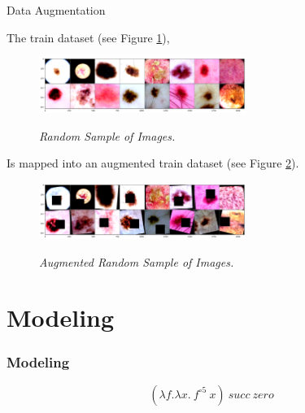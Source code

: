\documentclass[dvipsnames,mathserif]{beamer}
\begin{document}
{\begin{frame}
    \end{frame}

    \begin{frame}

      \large Data Augmentation
      \vspace{0.25cm}

      \footnotesize

      The train dataset (see Figure \ref{fig:sample-of-datasets}),

      \begin{figure}[H]
        \centering
        \includegraphics[width=0.6\textwidth]{images/random-sample-of-isic.png}
        \caption[Random Sample of Images]{\footnotesize{\textit{Random Sample of Images.}}}
        {\label{fig:sample-of-datasets}}
      \end{figure}

      Is mapped into an augmented train dataset (see Figure \ref{fig:aug-sample-of-datasets}).

      \begin{figure}[H]
        \centering
        \includegraphics[width=0.6\textwidth]{images/random-sample-of-isic-augmented.png}
        \caption[Augmented Random Sample of Images]{\footnotesize{\textit{Augmented Random Sample of Images.}}}
        {\label{fig:aug-sample-of-datasets}}
      \end{figure}

    \end{frame}


    \section{Modeling}

    \begin{frame}
      \frametitle{Modeling}

      \[(\lambda f. \lambda x.\ f^{\circ 5}\ x)\ succ\ zero\]
    \end{frame}

}
\end{document}
